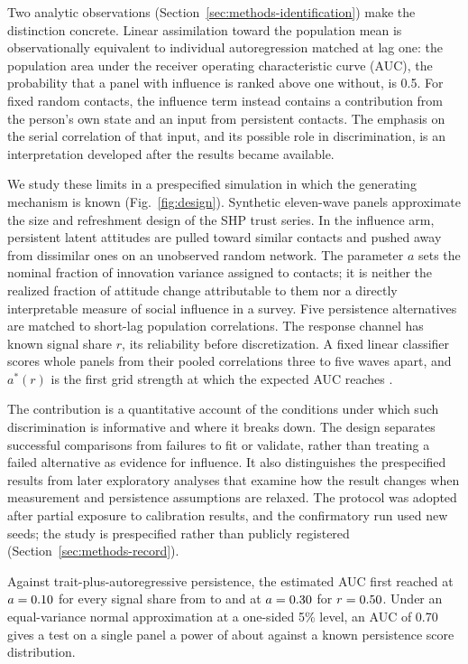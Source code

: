 Two analytic observations (Section~\ref{sec:methods-identification}) make the distinction concrete. Linear assimilation toward the population mean is observationally equivalent to individual autoregression matched at lag one: the population area under the receiver operating characteristic curve (AUC), the probability that a panel with influence is ranked above one without, is 0.5. For fixed random contacts, the influence term instead contains a contribution from the person's own state and an input from persistent contacts. The emphasis on the serial correlation of that input, and its possible role in discrimination, is an interpretation developed after the results became available.



We study these limits in a prespecified simulation in which the generating mechanism is known (Fig.~\ref{fig:design}). Synthetic eleven-wave panels approximate the size and refreshment design of the SHP trust series. In the influence arm, persistent latent attitudes are pulled toward similar contacts and pushed away from dissimilar ones on an unobserved random network. The parameter $a$ sets the nominal fraction of innovation variance assigned to contacts; it is neither the realized fraction of attitude change attributable to them nor a directly interpretable measure of social influence in a survey. Five persistence alternatives are matched to short-lag population correlations. The response channel has known signal share $r$, its reliability before discretization. A fixed linear classifier scores whole panels from their pooled correlations three to five waves apart, and $a^*(r)$ is the first grid strength at which the expected AUC reaches .

The contribution is a quantitative account of the conditions under which such discrimination is informative and where it breaks down. The design separates successful comparisons from failures to fit or validate, rather than treating a failed alternative as evidence for influence. It also distinguishes the prespecified results from later exploratory analyses that examine how the result changes when measurement and persistence assumptions are relaxed. The protocol was adopted after partial exposure to calibration results, and the confirmatory run used new seeds; the study is prespecified rather than publicly registered (Section~\ref{sec:methods-record}).

Against trait-plus-autoregressive persistence, the estimated AUC first reached  at $a=\resultnum{j.b.r055.first.point}{0.10}$ for every signal share from  to  and at $a=\resultnum{j.b.r050.first.point}{0.30}$ for $r=\resultnum{v4.tab.T1.B.r050.r}{0.50}$. Under an equal-variance normal approximation at a one-sided 5\% level, an AUC of 0.70 gives a test on a single panel a power of about  against a known persistence score distribution.

